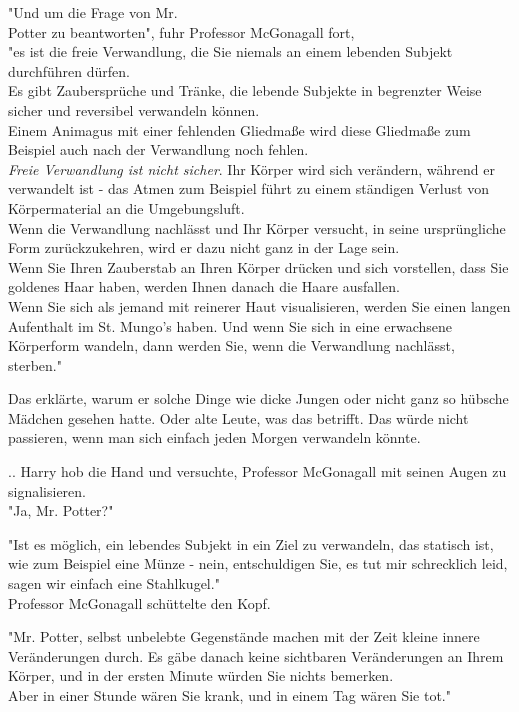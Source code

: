 {"Und um die Frage von Mr.\\ Potter zu beantworten", fuhr Professor McGonagall fort,\\ "es ist die freie Verwandlung, die Sie niemals an einem lebenden Subjekt durchführen dürfen.\\ Es gibt Zaubersprüche und Tränke, die lebende Subjekte in begrenzter Weise sicher und reversibel verwandeln können.\\ Einem Animagus mit einer fehlenden Gliedmaße wird diese Gliedmaße zum Beispiel auch nach der Verwandlung noch fehlen.\\ \emph{Freie Verwandlung ist nicht sicher}. Ihr Körper wird sich verändern, während er verwandelt ist - das Atmen zum Beispiel führt zu einem ständigen Verlust von Körpermaterial an die Umgebungsluft.\\ Wenn die Verwandlung nachlässt und Ihr Körper versucht, in seine ursprüngliche Form zurückzukehren, wird er dazu nicht ganz in der Lage sein.\\ Wenn Sie Ihren Zauberstab an Ihren Körper drücken und sich vorstellen, dass Sie goldenes Haar haben, werden Ihnen danach die Haare ausfallen.\\ Wenn Sie sich als jemand mit reinerer Haut visualisieren, werden Sie einen langen Aufenthalt im St. Mungo's haben. Und wenn Sie sich in eine erwachsene Körperform wandeln, dann werden Sie, wenn die Verwandlung nachlässt, sterben."

Das erklärte, warum er solche Dinge wie dicke Jungen oder nicht ganz so hübsche Mädchen gesehen hatte. Oder alte Leute, was das betrifft. Das würde nicht passieren, wenn man sich einfach jeden Morgen verwandeln könnte.

.. Harry hob die Hand und versuchte, Professor McGonagall mit seinen Augen zu signalisieren.\\ "Ja, Mr. Potter?"

"Ist es möglich, ein lebendes Subjekt in ein Ziel zu verwandeln, das statisch ist, wie zum Beispiel eine Münze - nein, entschuldigen Sie, es tut mir schrecklich leid, sagen wir einfach eine Stahlkugel."\\ Professor McGonagall schüttelte den Kopf.

"Mr. Potter, selbst unbelebte Gegenstände machen mit der Zeit kleine innere Veränderungen durch. Es gäbe danach keine sichtbaren Veränderungen an Ihrem Körper, und in der ersten Minute würden Sie nichts bemerken.\\ Aber in einer Stunde wären Sie krank, und in einem Tag wären Sie tot."

}
